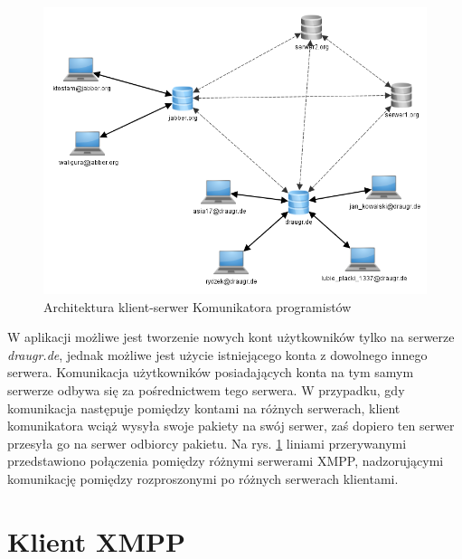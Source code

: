 \documentclass[polish,11pt,a4paper,twoside]{article}
\begin{document}
\begin{figure}[!htb]
  \begin{center}
    \includegraphics[width=1.0\textwidth]{img/architektura.png}
    \caption{Architektura klient-serwer Komunikatora programistów} \label{fig:architektura} 
  \end{center}
\end{figure}

W aplikacji możliwe jest tworzenie nowych kont użytkowników tylko na serwerze \emph{draugr.de}, jednak możliwe jest użycie istniejącego konta z dowolnego innego serwera. Komunikacja użytkowników posiadających konta na tym samym serwerze odbywa się za pośrednictwem tego serwera. W przypadku, gdy komunikacja następuje pomiędzy kontami na różnych serwerach, klient komunikatora wciąż wysyła swoje pakiety na swój serwer, zaś dopiero ten serwer przesyła go na serwer odbiorcy pakietu. Na rys. \ref{fig:architektura} liniami przerywanymi przedstawiono połączenia pomiędzy różnymi serwerami XMPP, nadzorującymi komunikację pomiędzy rozproszonymi po różnych serwerach klientami.



\section{Klient XMPP}
\end{document}
